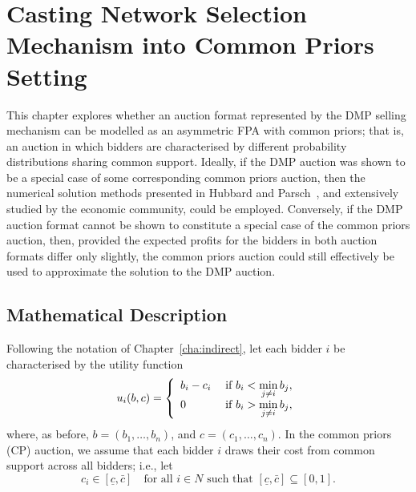 \chapter{Casting Network Selection Mechanism into Common Priors Setting}
\label{cha:approximation}

\minitoc
\vspace{10mm}

This chapter explores whether an auction format represented by the DMP selling mechanism can be modelled as an asymmetric FPA with common priors; that is, an auction in which bidders are characterised by different probability distributions sharing common support. Ideally, if the DMP auction was shown to be a special case of some corresponding common priors auction, then the numerical solution methods presented in Hubbard and Parsch~\cite{HubbardPaarsch2011}, and extensively studied by the economic community, could be employed. Conversely, if the DMP auction format cannot be shown to constitute a special case of the common priors auction, then, provided the expected profits for the bidders in both auction formats differ only slightly, the common priors auction could still effectively be used to approximate the solution to the DMP auction.

\section{Mathematical Description} %
\label{sec:mathematical_description_approximation}

Following the notation of Chapter~\ref{cha:indirect}, let each bidder $i$ be characterised by the utility function
\begin{equation}
  \label{eq:utility_approximation}
    u_i(b,c) = \left\{
  \begin{array}{l l}
    b_i-c_i & \;\text{if } b_i < \displaystyle\min_{j\neq i}b_j,\\
    0 & \;\text{if } b_i > \displaystyle\min_{j\neq i}b_j,
  \end{array}\right.
\end{equation}
where, as before, $b = (b_1,\ldots,b_n)$, and $c = (c_1,\ldots,c_n)$. In the common priors (CP) auction, we assume that each bidder $i$ draws their cost from common support across all bidders; i.e., let
\begin{equation*}
  c_i\in [\underline{c}, \bar{c}] \quad\text{for all } i\in N \text{ such that } [\underline{c}, \bar{c}]\subseteq [0, 1].
\end{equation*}

